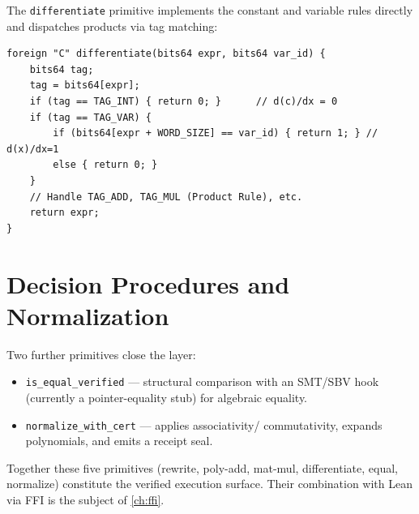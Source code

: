 The \texttt{differentiate} primitive implements the constant and variable
rules directly and dispatches products via tag matching:
\begin{lstlisting}[language=CM,caption={Symbolic differentiation (verified\_kernel.cm).},label=lst:cmm-diff]
foreign "C" differentiate(bits64 expr, bits64 var_id) {
    bits64 tag;
    tag = bits64[expr];
    if (tag == TAG_INT) { return 0; }      // d(c)/dx = 0
    if (tag == TAG_VAR) {
        if (bits64[expr + WORD_SIZE] == var_id) { return 1; } // d(x)/dx=1
        else { return 0; }
    }
    // Handle TAG_ADD, TAG_MUL (Product Rule), etc.
    return expr;
}
\end{lstlisting}

\section{Decision Procedures and Normalization}
\label{sec:cmm-dec}

Two further primitives close the layer:
\begin{itemize}
  \item \texttt{is\_equal\_verified} --- structural comparison with an
        SMT/SBV hook (currently a pointer-equality stub) for algebraic
        equality.
  \item \texttt{normalize\_with\_cert} --- applies associativity/
        commutativity, expands polynomials, and emits a receipt seal.
\end{itemize}
Together these five primitives (rewrite, poly-add, mat-mul, differentiate,
equal, normalize) constitute the verified execution surface. Their
combination with Lean via FFI is the subject of \cref{ch:ffi}.
